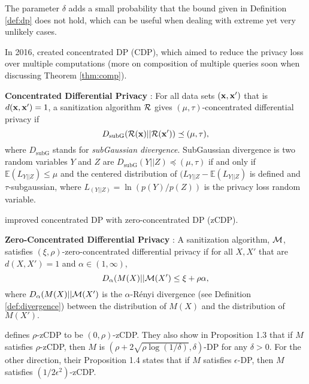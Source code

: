 The parameter $\delta$ adds a small probability that the bound given in Definition \ref{def:dp} does not hold, which can be useful when dealing with extreme yet very unlikely cases.

In 2016, \cite{dwork2016concentrated} created concentrated DP (CDP), which aimed to reduce the privacy loss over multiple computations (more on composition of multiple queries soon when discussing Theorem \ref{thm:comp}).

\begin{defn}\label{def:cdp} \textbf{Concentrated Differential Privacy} \autocite{dwork2016concentrated}:
For all data sets $(\mathbf{x},\mathbf{x}')$ that is $d(\mathbf{x},\mathbf{x}')=1$, a sanitization algorithm $\mathcal{R}$ gives $(\mu, \tau)$-concentrated differential privacy if 
\begin{equation}
    D_{\text{subG}}(\mathcal{R}(\mathbf{x})||\mathcal{R}(\mathbf{x}')) \preceq (\mu,\tau),
\end{equation}
where $D_{\text{subG}}$ stands for \emph{subGaussian divergence}. SubGaussian divergence is two random variables $Y$ and $Z$ are $D_{\text{subG}}(Y||Z) \preceq (\mu,\tau)$ if and only if  $\mathbb{E}(L_{Y||Z})\leq \mu$ and the centered distribution of $(L_{Y||Z}-\mathbb{E}(L_{Y||Z})$ is defined and $\tau$-subgaussian, where  $L_{(Y||Z)}=\ln\left(p(Y) /p(Z) \right)$ is the privacy loss random variable.
\end{defn}

\cite{bun2016concentrated} improved concentrated DP with zero-concentrated DP (zCDP).

\begin{defn}\label{def:scdp} \textbf{Zero-Concentrated Differential Privacy} \autocite{bun2016concentrated}:
A sanitization algorithm, $\mathcal{M}$, satisfies $(\xi, \rho)$-zero-concentrated differential privacy if for all $X, X'$ that are $d(X,X')=1$ and $\alpha\in (1, \infty)$,
    \begin{equation}
        D_\alpha(M(X)||\mathcal{M}(X')\leq\xi+\rho\alpha,
    \end{equation}
    where $D_\alpha(M(X)||\mathcal{M}(X')$ is the $\alpha$-R\'enyi divergence (see Definition \ref{def:divergence}) between the distribution of $M(X)$ and the distribution of $M(X').$
\end{defn}
\cite{bun2016concentrated} defines $\rho$-zCDP to be $(0,\rho)$-zCDP. They also show in Proposition 1.3 that if $M$ satisfies $\rho$-zCDP, then $M$ is $(\rho+2\sqrt{\rho\log(1/\delta)},\delta)$-DP for any $\delta>0$. For the other direction, their Proposition 1.4 states that if $M$ satisfies $\epsilon$-DP, then $M$ satisfies $(1/2\epsilon^2)$-zCDP.

